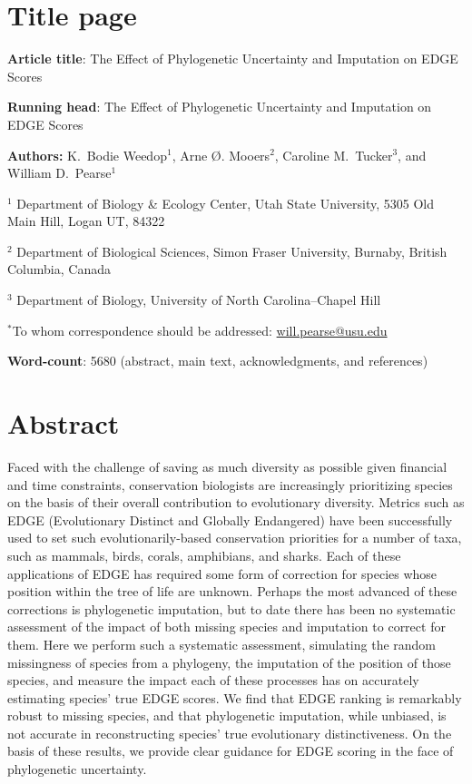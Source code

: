 \documentclass[12pt,english]{article}
\begin{document}
\setlength{\parindent}{0pt}
\section*{Title page}

\textbf{Article title}: The Effect of Phylogenetic Uncertainty and Imputation on EDGE Scores

\textbf{Running head}: The Effect of Phylogenetic Uncertainty and Imputation on EDGE Scores

\textbf{Authors:} K.\ Bodie Weedop$^{1}$, Arne \O. Mooers$^2$, Caroline M.\ Tucker$^3$, and William D.\ Pearse$^{1}$\

$^1$ Department of Biology \& Ecology Center, Utah State University,
5305 Old Main Hill, Logan UT, 84322

$^2$ Department of Biological Sciences, Simon Fraser University, Burnaby,
British Columbia, Canada

$^3$ Department of Biology, University of North Carolina–Chapel Hill

$^*$To whom correspondence should be addressed:
\url{will.pearse@usu.edu}

\textbf{Word-count}: 5680 (abstract, main text, acknowledgments, and
  references)

\clearpage
\section*{Abstract}

Faced with the challenge of saving as much diversity as possible given
financial and time constraints, conservation biologists are
increasingly prioritizing species on the basis of their overall
contribution to evolutionary diversity.
Metrics such as EDGE (Evolutionary Distinct and Globally Endangered)
have been successfully used to set such evolutionarily-based conservation priorities for a number of taxa,
such as mammals, birds, corals, amphibians, and sharks. Each of these
applications of EDGE has required some form of correction for species whose
position within the tree of life are unknown. Perhaps the most advanced of these
corrections is phylogenetic imputation, but to date there has been no systematic
assessment of the impact of both missing species and imputation to correct for
them. Here we perform such a systematic assessment, simulating the random
missingness of species from a phylogeny, the imputation of the position of those
species, and measure the impact each of these processes has on accurately estimating
species' true EDGE scores. We find that EDGE ranking is remarkably robust to
missing species, and that phylogenetic imputation, while unbiased, is not
accurate in reconstructing species' true evolutionary distinctiveness. On the
basis of these results, we provide clear guidance for EDGE scoring in the face
of phylogenetic uncertainty.
\end{document}
